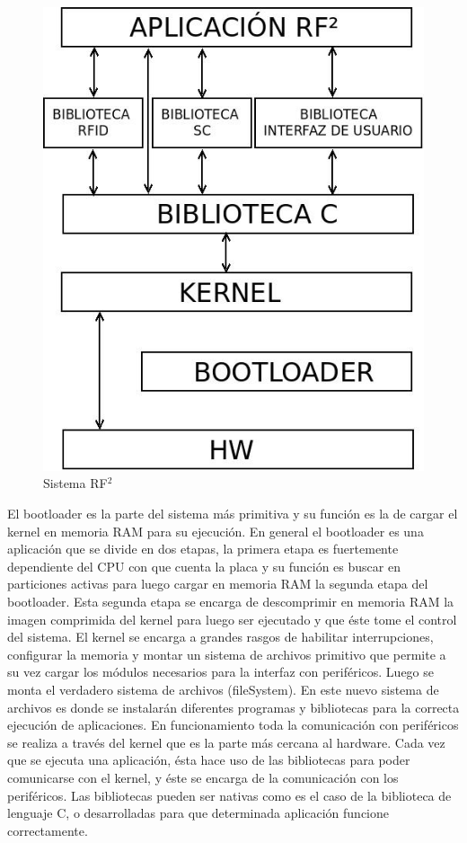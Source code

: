 \begin{figure}[H]
\centering
  \begin{center}
  \includegraphics[scale=.4]{Imagenes/SW.jpg} 
  \end{center}
  \caption{Sistema RF${^{2}}$}\label{Fig:SW} 
\end{figure}

El bootloader es la parte del sistema más primitiva y su función es la de cargar el
kernel en memoria RAM para su ejecución. En general el bootloader
es una aplicación que se divide en dos etapas, la primera etapa es fuertemente dependiente
del CPU con que cuenta la placa y su función es buscar en particiones activas para luego cargar 
en memoria RAM la segunda etapa del bootloader. Esta segunda etapa se encarga de descomprimir
en memoria RAM la imagen comprimida del kernel para luego ser ejecutado y que éste tome el
control del sistema.
El kernel se encarga a grandes rasgos de habilitar interrupciones, configurar la memoria y montar un sistema de archivos primitivo que permite a su vez cargar los módulos necesarios para la interfaz con periféricos. Luego se monta el verdadero sistema de archivos (fileSystem). En este nuevo sistema de archivos es donde se instalarán diferentes programas y bibliotecas para la correcta ejecución de aplicaciones.
En funcionamiento toda la comunicación con periféricos se realiza a través del kernel que es la parte más cercana al hardware.
Cada vez que se ejecuta una aplicación, ésta hace uso de las bibliotecas para poder comunicarse con el kernel, y éste se encarga de la comunicación con los periféricos. Las bibliotecas pueden ser nativas como es el caso de la biblioteca de lenguaje C, o desarrolladas para que determinada aplicación funcione correctamente.


